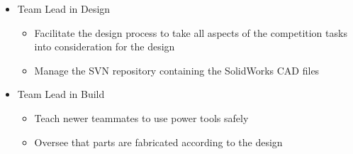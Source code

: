\documentclass[]{friggeri-cv} %
\begin{document}
\begin{entrylist}
{\begin{itemize}
\begin{itemize}
					\item Organize the data using spreadsheets, TableAU, and in house built programs
					\item Create a "pick list" of robots to alliance with, based off quantitative and qualitative data, as well as the robots' compatibility with our own
				\end{itemize}
			\item Team Lead in Design
				\begin{itemize}
					\item Facilitate the design process to take all aspects of the competition tasks into consideration for the design
					\item Manage the SVN repository containing the SolidWorks CAD files
				\end{itemize}
			\item Team Lead in Build
				\begin{itemize}
					\item Teach newer teammates to use power tools safely
					\item Oversee that parts are fabricated according to the design
				\end{itemize}
		\end{itemize}
	}



\end{entrylist}
\end{document}
